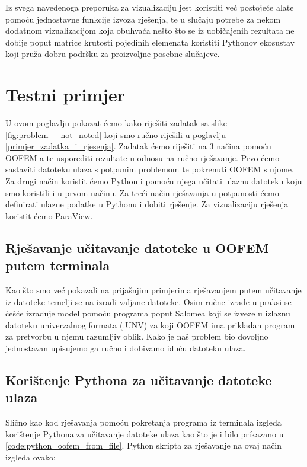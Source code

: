 \documentclass[a4paper,twoside,12pt]{memoir} %
\begin{document}
Iz svega navedenoga preporuka za vizualizaciju jest koristiti već postojeće alate pomoću jednostavne funkcije izvoza rješenja, te u slučaju potrebe za nekom dodatnom vizualizacijom koja obuhvaća nešto što se iz uobičajenih rezultata ne dobije poput matrice krutosti pojedinih elemenata koristiti Pythonov ekosustav koji pruža dobru podršku za proizvoljne posebne slučajeve.

\chapter{Testni primjer}
U ovom poglavlju pokazat ćemo kako riješiti zadatak sa slike \ref{fig:problem__not_noted} koji smo ručno riješili u poglavlju \ref{primjer_zadatka_i_rjesenja}. Zadatak ćemo riješiti na 3 načina pomoću OOFEM-a te usporediti rezultate u odnosu na ručno rješavanje. Prvo ćemo sastaviti datoteku ulaza s potpunim problemom te pokrenuti OOFEM s njome. Za drugi način koristit ćemo Python i pomoću njega učitati ulaznu datoteku koju smo koristili i u prvom načinu. Za treći način rješavanja u potpunosti ćemo definirati ulazne podatke u Pythonu i dobiti rješenje. Za vizualizaciju rješenja koristit ćemo ParaView.

\section{Rješavanje učitavanje datoteke u OOFEM putem terminala}
Kao što smo već pokazali na prijašnjim primjerima rješavanjem putem učitavanje iz datoteke temelji se na izradi valjane datoteke. Osim ručne izrade u praksi se češće izrađuje model pomoću programa poput Salomea koji se izveze u izlaznu datoteku univerzalnog formata (.UNV) za koji OOFEM ima prikladan program za pretvorbu u njemu razumljiv oblik. Kako je naš problem bio dovoljno jednostavan upisujemo ga ručno i dobivamo iduću datoteku ulaza.



\section{Korištenje Pythona za učitavanje datoteke ulaza}
Slično kao kod rješavanja pomoću pokretanja programa iz terminala izgleda korištenje Pythona za učitavanje datoteke ulaza kao što je i bilo prikazano u \ref{code:python_oofem_from_file}. Python skripta za rješavanje na ovaj način izgleda ovako: 
\end{document}
